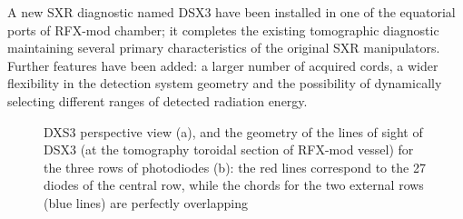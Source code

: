 A new SXR diagnostic named DSX3 have been installed in one of the equatorial ports of RFX-mod chamber; it completes the existing tomographic diagnostic maintaining several primary characteristics of the original SXR manipulators. Further
features have been added: a larger number of acquired cords, a wider flexibility in the detection system geometry and the possibility of dynamically selecting different ranges of detected radiation energy.
%
\begin{figure}
    \centering
    \caption{DXS3 perspective view (a), and the geometry of the lines of sight of DSX3 (at the tomography toroidal section
             of RFX-mod vessel) for the three rows of photodiodes (b): the red lines correspond to the
             27 diodes of the central row, while the chords for the two external rows (blue lines) are perfectly
             overlapping }
    \label{fig:DSX3_sketch}
\end{figure}




